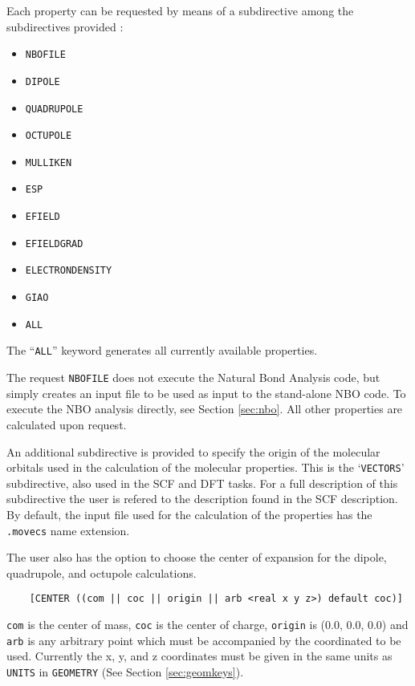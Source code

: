 Each property can be requested by means of a subdirective among the
subdirectives provided :

\begin{itemize}
\item {\tt NBOFILE}
\item {\tt DIPOLE}
\item {\tt QUADRUPOLE}
\item {\tt OCTUPOLE}
\item {\tt MULLIKEN}
\item {\tt ESP}
\item {\tt EFIELD}
\item {\tt EFIELDGRAD}
\item {\tt ELECTRONDENSITY}
\item {\tt GIAO}
\item {\tt ALL}
\end{itemize}

The ``{\tt ALL}'' keyword generates all currently available properties. 

The request {\tt NBOFILE} does not execute the Natural Bond Analysis
code, but simply creates an input file to be used as input to the
stand-alone NBO code. To execute the NBO analysis directly, see Section
\ref{sec:nbo}. All other properties are calculated upon
request.

An additional subdirective is provided to specify the origin of the
molecular orbitals used in the calculation of the molecular
properties. This is the `{\tt VECTORS}' subdirective, also used in the
SCF and DFT tasks. For a full description of this subdirective
the user is refered to the description found in the SCF description.
By default, the input file used for the calculation of the properties
has the \verb+.movecs+ name extension. 

The user also has the option to choose the center of expansion for
the dipole, quadrupole, and octupole calculations.

\begin{verbatim}
    [CENTER ((com || coc || origin || arb <real x y z>) default coc)]
\end{verbatim}

\verb+com+ is the center of mass, \verb+coc+ is the center of charge, \verb+origin+ is 
(0.0, 0.0, 0.0) and \verb+arb+ is any arbitrary point which must be accompanied
by the coordinated to be used.  Currently the x, y, and z coordinates
must be given in the same units as \verb+UNITS+ in \verb+GEOMETRY+ (See Section
\ref{sec:geomkeys}).

